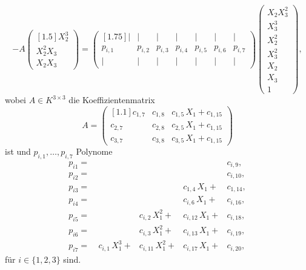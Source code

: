\documentclass[a4paper,oneside, 11pt, openany%
]{article}
\theoremstyle{custom}
\theoremstyle{custom}
\begin{document}
	\begin{equation*}
		-A
		\begin{pmatrix}[1.5]
			X_{2}^3\\
			X_{2}^2X_{3}\\
			X_{2}X_{3}
		\end{pmatrix}
		=
		\begin{pmatrix}[1.75]
			\vert & \vert & \vert & \vert & \vert& \vert& \vert \\
			p_{i,1}&p_{i,2}& p_{i,3}& p_{i,4}& p_{i,5}& p_{i,6}& p_{i,7}\\
			\vert & \vert & \vert & \vert & \vert& \vert& \vert
		\end{pmatrix}
		\begin{pmatrix}
			X_{2}X_{3}^2\\
			X_{3}^3\\
			X_{2}^2\\
			X_{3}^2\\
			X_{2}\\
			X_{3}\\
			1
		\end{pmatrix},
	\end{equation*}
	wobei $A \in K^{3 \times 3}$ die Koeffizientenmatrix
	\begin{equation}
		A = 
		\begin{pmatrix}[1.1]
			c_{1,7}& c_{1,8}&  c_{1,5}\,X_{1}+c_{1,15}\\
			c_{2,7}& c_{2,8}&  c_{2,5}\,X_{1}+c_{1,15}\\
			c_{3,7}& c_{3,8}&  c_{3,5}\,X_{1}+c_{1,15}
		\end{pmatrix}
	\end{equation}
	ist und $p_{i,1}, \ldots, p_{i,7}$ Polynome
	\begin{equation}
		\begin{alignedat}{4}
			p_{i1}= \ &&&&c_{i,9},\\
			p_{i2}= \ &&&&c_{i,10},\\
			p_{i3}= \ &&&c_{1,4}\,X_{1}+&c_{1,14},\\
			p_{i4}= \ &&&c_{i,6}\,X_{1}+&c_{i,16},\\
			p_{i5}= \ &&c_{i,2}\,X_{1}^2+&c_{i,12}\,X_{1}+&c_{i,18},\\
			p_{i6}= \ &&c_{i,3}\,X_{1}^2+&c_{i,13}\,X_{1}+&c_{i,19},\\
			p_{i7}= \ &c_{i,1}\,X_{1}^3+&c_{i,11}\,X_{1}^2+&c_{i,17}\,X_{1}+&c_{i,20},
		\end{alignedat}
	\end{equation}
	für $i\in \{1,2,3\}$ sind.\\
\end{document}
